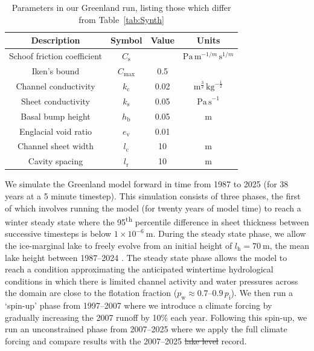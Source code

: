 \documentclass[tc, manuscript]{copernicus}
\providecommand{\DIFadd}[1]{{\protect\color{blue}\uwave{#1}}} %
\providecommand{\DIFdel}[1]{{\protect\color{red}\sout{#1}}} %
\providecommand{\DIFaddbegin}{} %
\providecommand{\DIFaddend}{} %
\providecommand{\DIFdelbegin}{} %
\providecommand{\DIFdelend}{} %
\providecommand{\DIFaddFL}[1]{\DIFadd{#1}} %
\providecommand{\DIFaddbeginFL}{} %
\providecommand{\DIFaddendFL}{} %
\begin{document}
\begin{table}[t]
\caption{Parameters in our Greenland run, listing those which differ from Table~\ref{tab:Synth}\DIFaddbeginFL \DIFaddFL{.}\DIFaddendFL }
\label{tab:Greenland}
\begin{tabular}{@{}cccc}
\hline
Description & Symbol & Value & Units \\
\hline
Schoof friction coefficient & $C_{\mathrm{s}}$ & & $\mathrm{Pa} \, \mathrm{m}^{-1/m}\,\mathrm{s}^{1/m}$ \\
Iken's bound & $C_{\mathrm{max}}$ & 0.5 & \\
Channel conductivity & $k_{\mathrm{c}}$ & 0.02 & $\mathrm{m}^{\frac{3}{2}}\, \mathrm{kg}^{-\frac{1}{2}}$ \\
Sheet conductivity & $k_{\mathrm{s}}$& 0.05 & $\mathrm{Pa\, s}^{-1}$ \\ 
Basal bump height & $h_{\mathrm{b}}$& 0.05 & m \\
Englacial void ratio & $e_{\mathrm{v}}$ & 0.01 & \\
Channel sheet width & $l_{\mathrm{c}}$& 10 & $\mathrm{m}$ \\
Cavity spacing & $l_{\mathrm{r}}$& 10 & $\mathrm{m}$ \\
\hline
\end{tabular}

\end{table}

We simulate the Greenland model forward in time from 1987 to 2025 (for 38 years at a 5 minute timestep). This simulation consists of three phases, the first of which involves running the model (for twenty years of model time) to reach a winter steady state where the 95\textsuperscript{th} percentile difference in sheet thickness between successive timesteps is below $1\times10^{-6}\ \mathrm{m}$. During the steady state phase, we allow the ice-marginal lake to freely evolve from an initial height of $l_{\mathrm{h}}=70\ \mathrm{m}$, the mean lake height between 1987--2024 \citep{livingstone2025ice}. The steady state phase allows the model to reach a condition approximating the anticipated wintertime hydrological conditions in which there is limited channel activity and water pressures across the domain are close to the flotation fraction ($p_{\mathrm{w}}\approx 0.7\text{--}0.9 \, p_{\mathrm{i}}$). We then run a `spin-up' phase from 1997--2007 where we introduce a climate forcing by gradually increasing the 2007 runoff by 10\% each year. Following this spin-up, we run an unconstrained phase from 2007--2025 where we apply the full climate forcing and compare results with the 2007--2025 \DIFdelbegin \DIFdel{lake level }\DIFdelend \DIFaddbegin \DIFadd{lake-level }\DIFaddend record.
\end{document}
